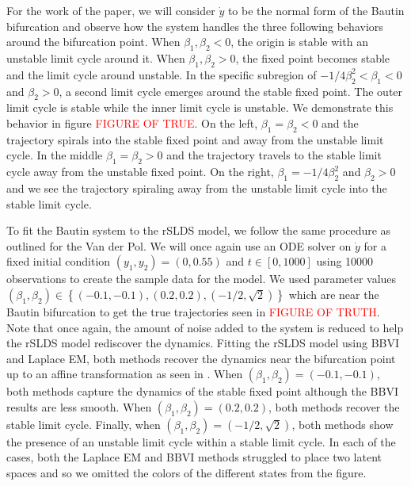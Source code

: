 For the work of the paper, we will consider $\dot{y}$ to be the normal form of the Bautin bifurcation and observe how the system handles the three following behaviors around the bifurcation point. When $\beta_1,\beta_2 < 0$, the origin is stable with an unstable limit cycle around it. When $\beta_1,\beta_2 > 0$, the fixed point becomes stable and the limit cycle around unstable. In the specific subregion of $-1/4 \beta_2^2 < \beta_1 < 0$ and $\beta_2>0$, a second limit cycle emerges around the stable fixed point. The outer limit cycle is stable while the inner limit cycle is unstable. We demonstrate this behavior in figure \textcolor{red}{FIGURE OF TRUE}. On the left, $\beta_1 = \beta_2 < 0$ and the trajectory spirals into the stable fixed point and away from the unstable limit cycle. In the middle $\beta_1 = \beta_2 > 0$ and the trajectory travels to the stable limit cycle away from the unstable fixed point. On the right, $\beta_1 = -1/4 \beta_2^2$ and $\beta_2 > 0$ and we see the trajectory spiraling away from the unstable limit cycle into the stable limit cycle. 

To fit the Bautin system to the rSLDS model, we follow the same procedure as outlined for the Van der Pol. We will once again use an ODE solver on $\dot{y}$ for a fixed initial condition $(y_1,y_2) = (0,0.55)$ and $t\in[0,1000]$ using 10000 observations to create the sample data for the model. We used parameter values $(\beta_1,\beta_2) \in \left\{(-0.1,-0.1),(0.2,0.2),\left(-1/2,\sqrt{2}\right)\right\}$ which are near the Bautin bifurcation to get the true trajectories seen in \textcolor{red}{FIGURE OF TRUTH}. Note that once again, the amount of noise added to the system is reduced to help the rSLDS model rediscover the dynamics. Fitting the rSLDS model using BBVI and Laplace EM, both methods recover the dynamics near the bifurcation point up to an affine transformation as seen in . When $(\beta_1,\beta_2) = (-0.1,-0.1)$, both methods capture the dynamics of the stable fixed point although the BBVI results are less smooth. When $(\beta_1,\beta_2) = (0.2,0.2)$, both methods recover the stable limit cycle. Finally, when $(\beta_1,\beta_2) = (-1/2,\sqrt{2})$, both methods show the presence of an unstable limit cycle within a stable limit cycle. In each of the cases, both the Laplace EM and BBVI methods struggled to place two latent spaces and so we omitted the colors of the different states from the figure.  

